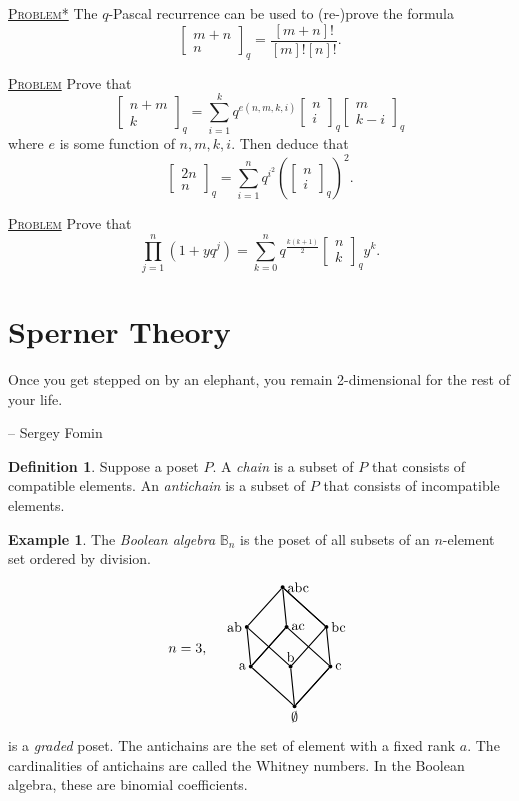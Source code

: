 \documentclass{report}
\newcommand{\B}{\mathbb{B}}
\newcommand{\qbin}[2]{\begin{bmatrix}{#1}\\ {#2}\end{bmatrix}_q}
\newcommand{\fancyem}[1]{\underline{\textsc{#1}}}
\theoremstyle{definition}
\newtheorem{definition}{Definition}[section]
\newtheorem{example}{Example}[section]
\theoremstyle{remark}
\numberwithin{equation}{section}
\begin{document}
\fancyem{Problem*} The $q$-Pascal recurrence can be used to (re-)prove the formula \[
    \qbin{m+n}{n} = \frac{[m+n]!}{[m]![n]!}.
\]

\fancyem{Problem} Prove that \[
    \qbin{n + m}{k} = \sum_{i=1}^k q^{e(n, m, k, i)} \qbin{n}{i} \qbin{m}{k-i}
\] where $e$ is some function of $n, m, k, i$. Then deduce that \[
    \qbin{2n}{n} = \sum_{i=1}^n q^{i^2} \left(\qbin{n}{i}\right)^2.    
\]

\fancyem{Problem} Prove that \[
    \prod_{j=1}^n(1+yq^j) = \sum_{k=0}^n q^{\frac{k(k+1)}{2}}\qbin{n}{k}y^k.
\]

\section{Sperner Theory}
\epigraph{Once you get stepped on by an elephant, you remain 2-dimensional for the rest of your life.}{-- \textup{Sergey Fomin}}
\begin{definition}
    Suppose a poset $P$. A \emph{chain} is a subset of $P$ that consists of compatible elements. An \emph{antichain} is a subset of $P$ that consists of incompatible elements.
\end{definition}
\begin{example}
    The \emph{Boolean algebra} $\B_n$ is the poset of all subsets of an $n$-element set ordered by division.
    \[n = 3, \quad
    \begin{tikzpicture}[baseline=(current bounding box.center)]
        \node[shape=circle, fill=black, scale = 0.3] (A1) at (-1, 0) {};
        \node[left] at (A1) {ab};
        \node[shape=circle, fill=black, scale = 0.3] (A2) at (-0.1, 1) {};
        \node[right] at (A2) {abc};
        \node[shape=circle, fill=black, scale = 0.3] (A3) at (1, 0) {};
        \node[right] at (A3) {bc};
        \node[shape=circle, fill=black, scale = 0.3] (A4) at (0.1, -1) {};
        \node[above] at (A4) {b};

        \node[shape=circle, fill=black, scale = 0.3] (A5) at (-0.9, -1) {};
        \node[left] at (A5) {a};
        \node[shape=circle, fill=black, scale = 0.3] (A6) at (0, 0) {};
        \node[right] at (A6) {ac};
        \node[shape=circle, fill=black, scale = 0.3] (A7) at (1.1, -1) {};
        \node[right] at (A7) {c};
        \node[shape=circle, fill=black, scale = 0.3] (A8) at (0.2, -2) {};
        \node[below] at (A8) {$\emptyset$};

        \draw[thick] (A1) to (A2) to (A3) to (A4) to (A1);
        \draw[thick] (A5) to (A6) to (A7) to (A8) to (A5);
        \draw[thick] (A1) to (A5) to (A6) to (A2) to (A3) to (A7) to (A8) to (A4);
    \end{tikzpicture}    
    \] is a \emph{graded} poset. The antichains are the set of element with a fixed rank $a$. The cardinalities of antichains are called the Whitney numbers. In the Boolean algebra, these are binomial coefficients.
\end{example}
\end{document}
